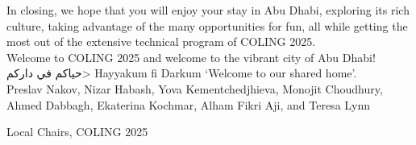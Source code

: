In closing, we hope that you will enjoy your stay in Abu Dhabi, exploring its rich culture, taking advantage of the many opportunities for fun, all while getting the most out of the extensive technical program of COLING 2025.\\

Welcome to COLING 2025 and welcome to the vibrant city of Abu Dhabi!\\

\<حياكم في داركم> Hayyakum fi Darkum `Welcome to our shared home’.\\

Preslav Nakov, Nizar Habash, Yova Kementchedjhieva, Monojit Choudhury, Ahmed Dabbagh, Ekaterina Kochmar, Alham Fikri Aji, and Teresa Lynn

Local Chairs, COLING 2025


